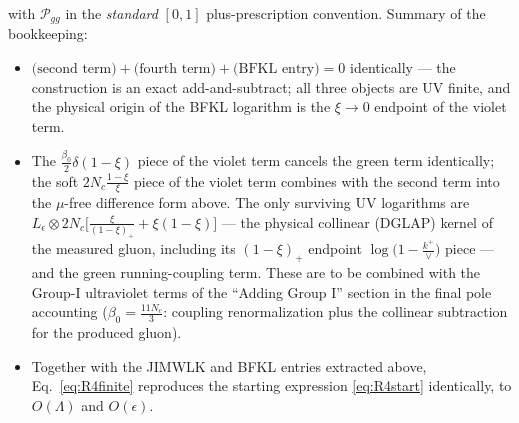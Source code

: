 \documentclass[9pt]{article}
\numberwithin{equation}{section}
\begin{document}
with $\mathcal{P}_{gg}$ in the \emph{standard} $[0,1]$ plus-prescription convention. Summary of the
bookkeeping:
\begin{itemize}
\item[(i)] $\big(\text{second term}\big)+\big(\text{fourth term}\big)+\big(\text{BFKL entry}\big)=0$
identically --- the construction is an exact add-and-subtract; all three objects are UV finite, and
the physical origin of the BFKL logarithm is the $\xi\to0$ endpoint of the violet term.
\item[(ii)] The $\frac{\beta_{0}}{2}\delta(1-\xi)$ piece of the violet term cancels the green term
identically; the soft $2N_{c}\frac{1-\xi}{\xi}$ piece of the violet term combines with the second
term into the $\mu$-free difference form above. The only surviving UV logarithms are
$L_{\epsilon}\otimes2N_{c}\big[\frac{\xi}{(1-\xi)_{+}}+\xi(1-\xi)\big]$ --- the physical collinear
(DGLAP) kernel of the measured gluon, including its $(1-\xi)_{+}$ endpoint
$\log\big(1-\frac{k^{+}}{\vee}\big)$ piece --- and the green running-coupling term. These are to be
combined with the Group-I ultraviolet terms of the ``Adding Group I'' section in the final pole
accounting ($\beta_{0}=\frac{11N_{c}}{3}$: coupling renormalization plus the collinear subtraction
for the produced gluon).
\item[(iii)] Together with the JIMWLK and BFKL entries extracted above, Eq.~\eqref{eq:R4finite}
reproduces the starting expression \eqref{eq:R4start} identically, to $O(\Lambda)$ and $O(\epsilon)$.
\end{itemize}
\end{document}
